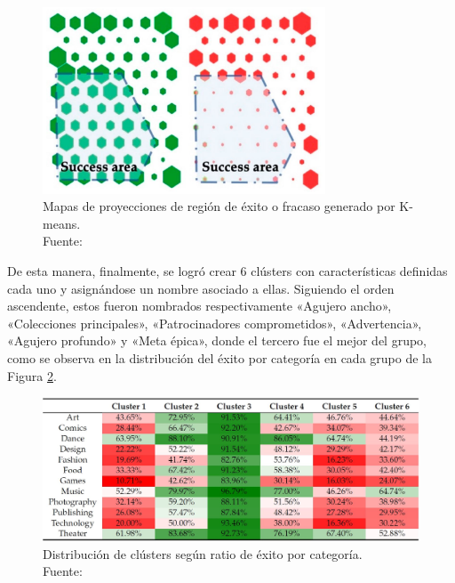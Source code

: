 \begin{figure}[!ht]
	\begin{center}
		\includegraphics[width=0.75\textwidth]{2/figures/fernandez2020_metodologia.jpg}
		\caption[Mapas de proyecciones de región de éxito o fracaso generado por K-means]{Mapas de proyecciones de región de éxito o fracaso generado por K-means.\\
			Fuente: \cite{pr_fernandezblanco2020crowdfunding_empirical}}
		\label{2:fig129}
	\end{center}
\end{figure}

\newpage
De esta manera, finalmente, se logró crear 6 clústers con características definidas cada uno y asignándose un nombre asociado a ellas. Siguiendo el orden ascendente, estos fueron nombrados respectivamente «Agujero ancho», «Colecciones principales», «Patrocinadores comprometidos», «Advertencia», «Agujero profundo» y «Meta épica», donde el tercero fue el mejor del grupo, como se observa en la distribución del éxito por categoría en cada grupo de la Figura \ref{2:fig130}.

\begin{figure}[!ht]
	\begin{center}
		\includegraphics[width=1\textwidth]{2/figures/fernandez2020_clusters_categoria.jpg}
		\caption[Distribución de clústers según ratio de éxito por categoría]{Distribución de clústers según ratio de éxito por categoría.\\
			Fuente: \cite{pr_fernandezblanco2020crowdfunding_empirical}}
		\label{2:fig130}
	\end{center}
\end{figure}